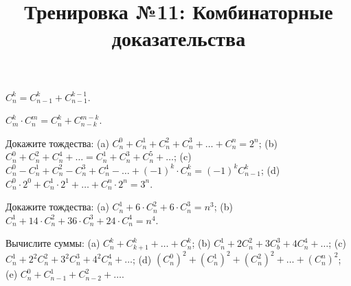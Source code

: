 



\title{Тренировка №11: Комбинаторные доказательства}
\maketitle

\begin{problem}
	$C_n^k = C_{n-1}^k + C_{n-1}^{k-1}$.
\end{problem}

\begin{problem}
	$C_m^k \cdot C_n^m = C_n^k + C_{n-k}^{m-k}$.
\end{problem}

\begin{problem}
	Докажите тождества: (a) $C_n^0 + C_n^1 + C_n^2 + C_n^3 + \ldots + C_n^n = 2^n$; \medskip (b) $C_n^0 + C_n^2 + C_n^4 + \ldots = C_n^1 + C_n^3 + C_n^5 + \ldots$; \medskip (c) $C_n^0 - C_n^1 + C_n^2 - C_n^3 + C_n^4 - \ldots + (-1)^k \cdot C_n^k = (-1)^k C_{n-1}^k$; \medskip (d) $C_n^0 \cdot 2^0 + C_n^1 \cdot 2^1 + \ldots + C_n^n \cdot 2^n = 3^n$.
\end{problem}

\begin{problem}
	Докажите тождества: (a) $C_n^1 + 6 \cdot C_n^2 + 6 \cdot C_n^3 = n^3$; \medskip (b) $C_n^1 + 14 \cdot C_n^2 + 36 \cdot C_n^3 + 24 \cdot C_n^4 = n^4$.
\end{problem}

\begin{problem}
	Вычислите суммы: (a) $C_n^k + C_{k+1}^k + \ldots + C_n^k$; \medskip (b) $C_n^1 + 2 C_n^2 + 3 C_b^3 + 4 C_n^4 + \ldots$; \medskip (c) $C_n^1 + 2^2 C_n^2 + 3^2 C_n^3 + 4^2 C_n^4 + \ldots$; \medskip (d) $(C_n^0)^2 + (C_n^1)^2 + (C_n^2)^2 + \ldots + (C_n^n)^2$; \medskip (e) $C_n^0 + C_{n-1}^1 + C_{n-2}^2 + \ldots$.
\end{problem}


